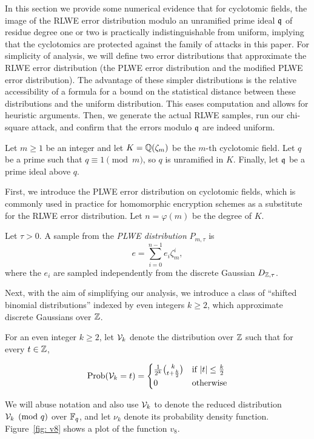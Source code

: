 \documentclass[envcountsame]{llncs}
\begin{document}
In this section we provide some numerical evidence that for cyclotomic fields, the image of the RLWE error distribution modulo an unramified prime ideal $\mathfrak{q}$ of residue degree one or two is practically indistinguishable from uniform, implying that the cyclotomics are protected against the family of attacks in this paper.  For simplicity of analysis, we will define two error distributions that approximate the RLWE error distribution (the PLWE error distribution and the modified PLWE error distribution).  The advantage of these simpler distributions is the relative accessibility of a formula for a bound on the statistical distance between these distributions and the uniform distribution.  This eases computation and allows for heuristic arguments. Then, we generate the actual RLWE samples, run our chi-square attack, and confirm that the errors modulo $\mathfrak{q}$ are indeed uniform.



Let $m \geq 1$ be an integer and let $K = \mathbb{Q}(\zeta_m)$ be the $m$-th cyclotomic field. Let $q$ be a prime such that
$q \equiv 1\pmod{m}$, so $q$ is unramified in $K$. Finally, let $\mathfrak{q}$ be a prime ideal above $q$.

First, we introduce the PLWE error distribution on cyclotomic fields, which is commonly used in practice for homomorphic encryption schemes as a substitute for the RLWE error distribution. Let $n = \varphi(m)$ be the degree of $K$.
\begin{definition}
Let $\tau > 0$. A sample from the {\it PLWE distribution} $P_{m,\tau}$ is
\[
    e = \sum_{i=0}^{n-1} e_i \zeta_m^i,
\]
where the $e_i$ are sampled independently from the discrete Gaussian $D_{\mathbb{Z},\tau}$.
\end{definition}

Next, with the aim of simplifying our analysis, we introduce a class of ``shifted binomial distributions'' indexed by even integers $k \geq 2$, which approximate discrete Gaussians over $\mathbb{Z}$.

\begin{definition}
For an even integer $k \geq 2$, let $\mathcal{V}_{k}$ denote the distribution over $\mathbb{Z}$ such that for every $t \in \mathbb{Z}$,

$$\operatorname{Prob}(\mathcal{V}_{k} = t) =  \begin{cases} \frac{1}{2^k}{k \choose t+\frac{k}{2}} &\mbox{if } |t| \leq \frac{k}{2} \\
0 & \mbox{otherwise}  \end{cases}$$

\end{definition}
We will abuse notation and also use $\mathcal{V}_{k}$ to denote the reduced  distribution $\mathcal{V}_{k} \pmod {q}$ over $\mathbb{F}_q$, and let $\nu_{k}$ denote its probability density function. Figure~\ref{fig: v8} shows a plot of the function $v_8$.
\end{document}
